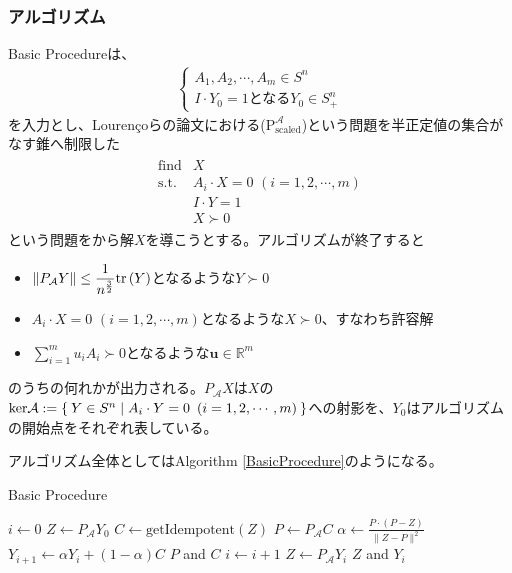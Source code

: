 \subsubsection{アルゴリズム}
Basic Procedureは、
\begin{align*}
  \begin{cases}
      A_1, A_2, \cdots, A_m \in S^n \\
      I \cdot Y_0 = 1 \text{となる} Y_0 \in S_+^n
    \end{cases}
\end{align*}
を入力とし、Louren\c{c}oらの論文における($\mathrm{P}_\mathrm{scaled}^\mathcal{A}$)という問題を半正定値の集合がなす錐へ制限した
\begin{align*}
  \begin{array}{ll}
    \text{find} & X \\
    \text{s.t.} & A_i \cdot X = 0 \,\, \left(i = 1, 2, \cdots, m\right) \\
                & I \cdot Y = 1 \\
                & X \succ 0
  \end{array}
\end{align*}
という問題をから解$X$を導こうとする。アルゴリズムが終了すると
\begin{itemize}
  \item $\displaystyle{\|P_\mathcal{A} Y\| \leq \frac{1}{n^{\frac{3}{2}}} \mathrm{tr}\parenthesis(Y)}$となるような$Y \succ 0$
  \item $A_i \cdot X = 0 \,\, \left(i = 1, 2, \cdots, m\right)$となるような$X \succ 0$、すなわち許容解
  \item $\displaystyle{\sum_{i = 1}^m u_i A_i \succ 0}$となるような$\mathbf{u} \in \mathbb{R}^m$
\end{itemize}
のうちの何れかが出力される。$P_\mathcal{A} X$は$X$の$\mathrm{ker}\mathcal{A} := \Set{Y \in S^n | A_i \cdot Y = 0 \,\, \left(i = 1, 2, \cdots, m\right)}$への射影を、$Y_0$はアルゴリズムの開始点をそれぞれ表している。

アルゴリズム全体としてはAlgorithm \ref{BasicProcedure}のようになる。
\begin{algorithm}
  \caption{Basic Procedure}
  \label{BasicProcedure}
  \begin{algorithmic}[1]
    \State $i \leftarrow 0$
    \State $Z \leftarrow P_\mathcal{A} Y_0$
      \State $C \leftarrow \text{getIdempotent}\left(Z\right)$
      \State $P \leftarrow P_\mathcal{A} C$
        \State $\alpha \leftarrow \displaystyle{\frac{P \cdot \left(P - Z\right)}{\|Z - P\|^2}}$
        \State $Y_{i + 1} \leftarrow \alpha Y_i + \left(1 - \alpha\right) C$
      \Else
        \State \Return $P$ and $C$
      \EndIf
      \State $i \leftarrow i + 1$
      \State $Z \leftarrow P_\mathcal{A} Y_i$
    \EndWhile
    \State \Return $Z$ and $Y_i$
  \end{algorithmic}
\end{algorithm}

